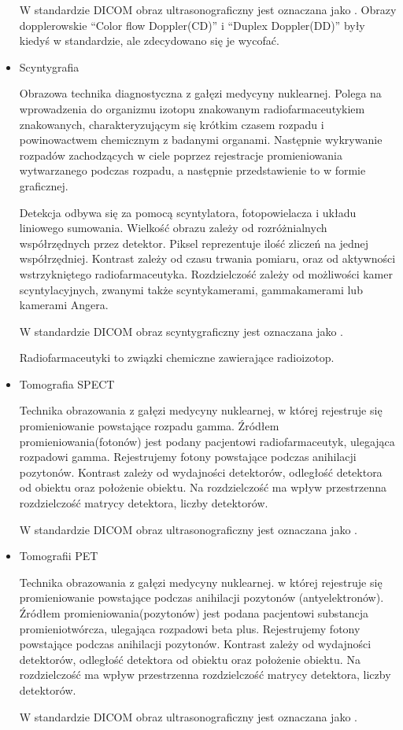 \begin{itemize}
          W standardzie DICOM obraz ultrasonograficzny jest oznaczana jako .
          Obrazy dopplerowskie \enquote{Color flow Doppler(CD)} i \enquote{Duplex Doppler(DD)} były kiedyś w standardzie, ale zdecydowano się je wycofać.

    \item Scyntygrafia

          Obrazowa technika diagnostyczna z gałęzi medycyny nuklearnej.
          Polega na wprowadzenia do organizmu izotopu znakowanym radiofarmaceutykiem znakowanych, charakteryzującym się krótkim czasem rozpadu i powinowactwem chemicznym z badanymi organami.
          Następnie wykrywanie rozpadów zachodzących w ciele poprzez rejestracje promieniowania wytwarzanego podczas rozpadu, a następnie przedstawienie to w formie graficznej.

          Detekcja odbywa się za pomocą scyntylatora, fotopowielacza i układu liniowego sumowania.
          Wielkość obrazu zależy od rozróżnialnych współrzędnych przez detektor.
          Piksel reprezentuje ilość zliczeń na jednej współrzędniej.
          Kontrast zależy od czasu trwania pomiaru, oraz od aktywności wstrzykniętego radiofarmaceutyka.
          Rozdzielczość zależy od możliwości kamer scyntylacyjnych, zwanymi także scyntykamerami, gammakamerami lub kamerami Angera.

          W standardzie DICOM obraz scyntygraficzny jest oznaczana jako .

          Radiofarmaceutyki to związki chemiczne zawierające radioizotop.

    \item Tomografia SPECT

          Technika obrazowania  z gałęzi medycyny nuklearnej, w której rejestruje się promieniowanie powstające rozpadu gamma.
          Źródłem promieniowania(fotonów) jest podany pacjentowi radiofarmaceutyk, ulegająca rozpadowi gamma.
          Rejestrujemy fotony powstające podczas anihilacji pozytonów.
          Kontrast zależy od wydajności detektorów, odległość detektora od obiektu oraz położenie obiektu.
          Na rozdzielczość ma wpływ przestrzenna rozdzielczość matrycy detektora, liczby detektorów.

          W standardzie DICOM obraz ultrasonograficzny jest oznaczana jako .

    \item Tomografii PET

          Technika obrazowania  z gałęzi medycyny nuklearnej. w której rejestruje się promieniowanie powstające podczas anihilacji pozytonów (antyelektronów).
          Źródłem promieniowania(pozytonów) jest podana pacjentowi substancja promieniotwórcza, ulegająca rozpadowi beta plus.
          Rejestrujemy fotony powstające podczas anihilacji pozytonów.
          Kontrast zależy od wydajności detektorów, odległość detektora od obiektu oraz położenie obiektu.
          Na rozdzielczość ma wpływ przestrzenna rozdzielczość matrycy detektora, liczby detektorów.

          W standardzie DICOM obraz ultrasonograficzny jest oznaczana jako .

\end{itemize}

